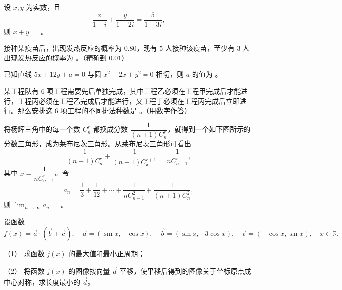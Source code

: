 \begin{question}
设 $x,y$ 为实数，且
\nopagebreak[4]
\[
\frac{x}{1-i}+\frac{y}{1-2i}=\frac{5}{1-3i},
\]
则 $x+y=$ \gkblank{}。

\end{question}
\begin{question}
接种某疫苗后，出现发热反应的概率为 $0.80$，现有 $5$ 人接种该疫苗，至少有 $3$ 人出现发热反应的概率为 \gkblank{}。（精确到 $0.01$）

\end{question}
\begin{question}
已知直线 $5x+12y+a=0$ 与圆 $x^2-2x+y^2=0$ 相切，则 $a$ 的值为 \gkblank{}。

\end{question}
\begin{question}
某工程队有 $6$ 项工程需要先后单独完成，其中工程乙必须在工程甲完成后才能进行，工程丙必须在工程乙完成后才能进行，又工程丁必须在工程丙完成后立即进行。那么安排这 $6$ 项工程的不同排法种数是 \gkblank{}。（用数字作答）

\Needspace{0.4\textheight}
\end{question}
\begin{question}
将杨辉三角中的每一个数 $C_n^r$ 都换成分数 $\dfrac{1}{(n+1)C_n^r}$，就得到一个如下图所示的分数三角形，成为莱布尼茨三角形。从莱布尼茨三角形可看出
\nopagebreak[4]
\[
\frac{1}{(n+1)C_n^r}+\frac{1}{(n+1)C_n^{r+1}}=\frac{1}{nC_{n-1}^r},
\]
其中 $x=\dfrac{1}{nC_{n-1}^r}$。令
\nopagebreak[4]
\[
a_n=\frac13+\frac1{12}+\cdots+\frac{1}{nC_{n-1}^{2}}+\frac{1}{(n+1)C_n^{2}},
\]
则 $\displaystyle\lim_{n\to\infty}a_n=$ \gkblank{}。
\nopagebreak[4]
\begin{center}\end{center}
\nopagebreak[4]
\end{question}
\begin{question}
设函数
\nopagebreak[4]
\[
f(x)=\vec a\cdot(\vec b+\vec c),\quad
\vec a=(\sin x,-\cos x),\quad
\vec b=(\sin x,-3\cos x),\quad
\vec c=(-\cos x,\sin x),\quad x\in\mathbb R.
\]

（1） 求函数 $f(x)$ 的最大值和最小正周期；

（2） 将函数 $f(x)$ 的图像按向量 $\vec d$ 平移，使平移后得到的图像关于坐标原点成中心对称，求长度最小的 $\vec d$。

\end{question}

